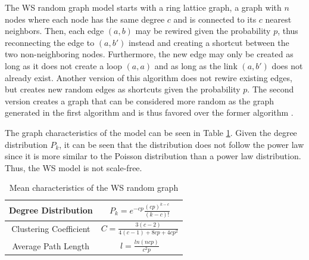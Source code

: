 The WS random graph model starts with a ring lattice graph, a graph 
with $n$ nodes where each node has the same degree $c$ and 
is connected to its $c$ nearest neighbors. Then, each edge $(a, b)$
may be rewired given the probability $p$, thus reconnecting the edge to  $(a, b')$
instead and creating a shortcut between the two non-neighboring nodes.
Furthermore, the new edge may only be created as long as it does not create
a loop $(a, a)$ and as long as the link $(a, b')$ does not already exist.
Another version of this algorithm does not rewire existing edges,
but creates new random edges as shortcuts given the probability $p$.
The second version creates a graph that can be considered more 
\glqq random\grqq{} as the graph generated in the first algorithm and is
thus favored over the former algorithm \cite{basicnetwork}.

The graph characteristics of the model can be seen
in Table \ref{ws-model}. Given the degree distribution $P_k$, it can be seen
that the distribution does not follow the power law since it is more similar
to the Poisson distribution than a power law distribution. Thus, the WS model
is not scale-free.

\begin{table}[ht!]
    \centering
    \begin{tabular}{|c | c |} 
     \hline
     Degree Distribution & 
     $P_k = e^{-cp}\frac{(cp)^{k-c}}{(k-c)!}$ \\ 
     \hline
     Clustering Coefficient & 
     $C=\frac{3(c-2)}{4(c-1) + 8cp +4cp^2}$ \\ 
     \hline
     Average Path Length & $l = \frac{ln(ncp)}{c^2p}$ \\ 
     \hline
    \end{tabular}
    \caption{Mean characteristics of the WS random graph \cite{basicnetwork}}
    \label{ws-model}
\end{table}



